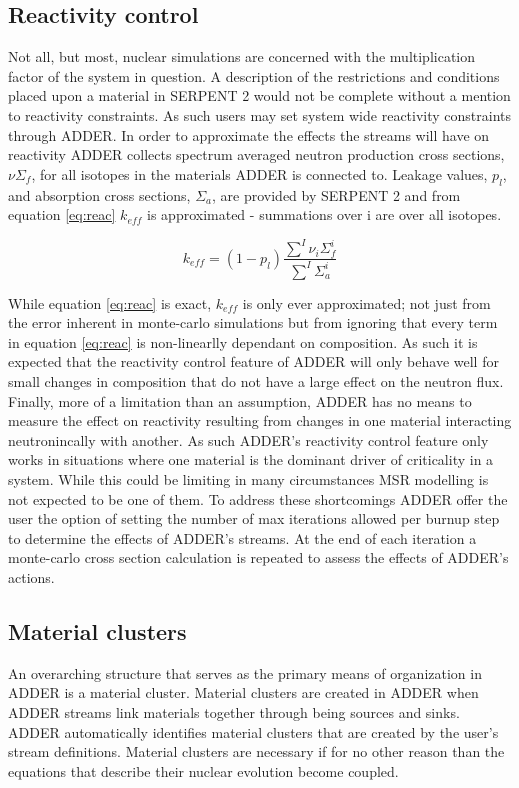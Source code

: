 \documentclass[]{elsarticle}
\begin{document}
\subsection{Reactivity control} \label{ssec:reactivity}
Not all, but most, nuclear simulations are concerned with the multiplication
factor of the system in question. A description of the restrictions and
conditions placed
upon a material in SERPENT 2 would not be complete without a mention to
reactivity constraints. As such users may set system wide reactivity
constraints through ADDER. In order to approximate the effects the streams will
have on reactivity ADDER collects spectrum averaged neutron production cross
sections, $\nu \Sigma_{f}$, for all isotopes in the materials ADDER is
connected to. Leakage values, $p_{l}$, and absorption cross sections,
$\Sigma_{a}$, are provided by SERPENT 2 and from equation \ref{eq:reac}
$k_{eff}$ is approximated - summations over i are over all isotopes.

\begin{equation}
\label{eq:reac}
k_{eff} = (1 - p_{l}) \frac{\sum\limits^{I} \nu_{i} \Sigma_{f}^{i}}{\sum\limits^{I} \Sigma_{a}^{i}}
\end{equation}

While equation \ref{eq:reac} is exact, $k_{eff}$ is only ever approximated;
not just from the error inherent in monte-carlo simulations but from
ignoring that every term in equation \ref{eq:reac} is non-linearlly dependant
on composition. As such it is expected that the reactivity control feature of
ADDER will only behave well for small changes in composition that do not have a
large effect on the neutron flux. Finally, more of a limitation than an
assumption, ADDER has no means to measure the effect on reactivity resulting
from changes in one material interacting neutronincally with another. As such 
ADDER's reactivity control feature only works in situations where one 
material is the dominant driver of criticality in a system. While this could be
limiting in many circumstances MSR modelling is not expected to be one of them.
To address these shortcomings ADDER offer the user the option of setting the
number of max iterations allowed per burnup step to determine the effects of
ADDER's streams. At the end of each iteration a monte-carlo cross section
calculation is repeated to assess the effects of ADDER's actions.

\subsection{Material clusters}
An overarching structure that serves as the primary means of organization in
ADDER is a material cluster. Material clusters are created in ADDER when ADDER
streams link materials together through being sources and sinks. ADDER
automatically identifies material clusters that are created by the user's
stream definitions. Material clusters are necessary if for no other reason than
the equations that describe their nuclear evolution become coupled. 
\end{document}
